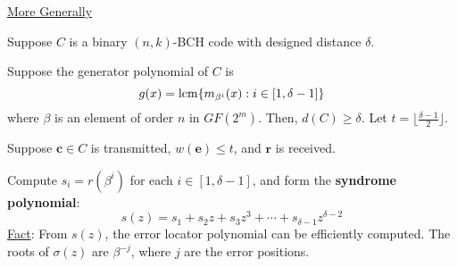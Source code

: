 \underline{More Generally}

Suppose $ C $ is a binary $ (n,k) $-BCH code with designed distance $ \delta $.

Suppose the generator polynomial of $ C $ is
\[ g(x)=\operatorname{lcm} \{m_{\beta^i}(x):i\in[1,\delta-1]\} \]
where $ \beta $ is an element of order $ n $ in $ GF(2^m) $. Then, $ d(C)\geqslant \delta $.
Let $ t=\lfloor \frac{\delta-1}{2} \rfloor $.

Suppose $ \symbf{c}\in C $ is transmitted, $ w(\symbf{e})\leqslant t $, and $ \symbf{r} $
is received.

Compute $ s_i=r(\beta^i) $ for each $ i\in[1,\delta-1] $, and form the
\textbf{syndrome polynomial}:
\[ s(z)=s_1+s_2z+s_3z^3+\cdots+s_{\delta-1}z^{\delta-2} \]
\underline{Fact}: From $ s(z) $, the error locator polynomial
can be efficiently computed. The roots of $ \sigma(z) $
are $ \beta^{-j} $, where $ j $ are the error positions.
